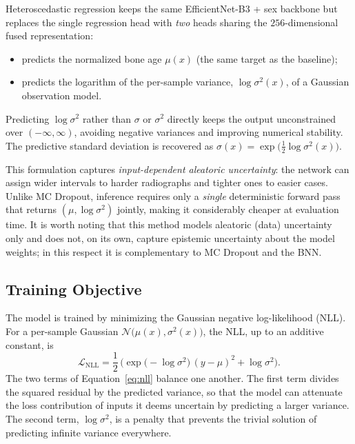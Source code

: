 Heteroscedastic regression keeps the same EfficientNet-B3 + sex backbone but
replaces the single regression head with \emph{two} heads sharing the
$256$-dimensional fused representation:
\begin{itemize}
  \item {} predicts the normalized bone age $\mu(x)$ (the same
  target as the baseline);
  \item {} predicts the logarithm of the per-sample variance,
  $\log \sigma^2(x)$, of a Gaussian observation model.
\end{itemize}
Predicting $\log \sigma^2$ rather than $\sigma$ or $\sigma^2$ directly keeps the
output unconstrained over $(-\infty, \infty)$, avoiding negative variances and
improving numerical stability. The predictive standard deviation is recovered
as $\sigma(x) = \exp\!\big(\tfrac{1}{2}\log\sigma^2(x)\big)$.

This formulation captures \emph{input-dependent aleatoric uncertainty}: the
network can assign wider intervals to harder radiographs and tighter ones to
easier cases. Unlike MC Dropout, inference requires only a \emph{single}
deterministic forward pass that returns $(\mu, \log\sigma^2)$ jointly, making it
considerably cheaper at evaluation time. It is worth noting that this method
models aleatoric (data) uncertainty only and does not, on its own, capture
epistemic uncertainty about the model weights; in this respect it is
complementary to MC Dropout and the BNN.

\subsection{Training Objective}

The model is trained by minimizing the Gaussian negative log-likelihood (NLL).
For a per-sample Gaussian $\mathcal{N}\!\big(\mu(x), \sigma^2(x)\big)$, the NLL,
up to an additive constant, is
\begin{equation}
  \mathcal{L}_\text{NLL} =
  \frac{1}{2}\,\Big(\exp\!\big(-\log\sigma^2\big)\,(y - \mu)^2 + \log\sigma^2\Big).
  \label{eq:nll}
\end{equation}
The two terms of Equation~\eqref{eq:nll} balance one another. The first term
divides the squared residual by the predicted variance, so that the model can
attenuate the loss contribution of inputs it deems uncertain by predicting a
larger variance. The second term, $\log\sigma^2$, is a penalty that prevents the
trivial solution of predicting infinite variance everywhere.

